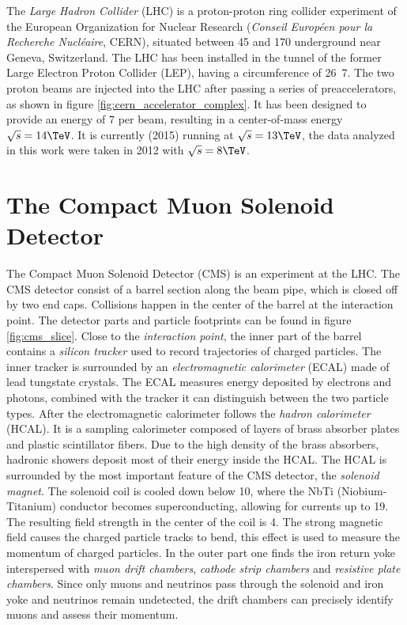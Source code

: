 The \emph{Large Hadron Collider} (LHC) is a proton-proton ring collider experiment of the European Organization for Nuclear Research (\emph{Conseil Européen pour la Recherche Nucléaire}, CERN), situated between \unit{45}{\meter} and \unit{170}{\meter} underground near Geneva, Switzerland. The LHC has been installed in the tunnel of the former Large Electron Proton Collider (LEP), having a circumference of \unit{26.7}{\kilo\meter}\cite{BV2009CERN,EB2008LHC}. The two proton beams are injected into the LHC after passing a series of preaccelerators, as shown in figure \ref{fig:cern_accelerator_complex}. It has been designed to provide an energy of \unit{7}{\TeV} per beam, resulting in a center-of-mass energy $\sqrt{s} = \unit{14}{\TeV}$. It is currently (2015) running at $\sqrt{s} = \unit{13}{\TeV}$, the data analyzed in this work were taken in 2012 with $\sqrt{s} = \unit{8}{\TeV}$.

\section{The Compact Muon Solenoid Detector}
The Compact Muon Solenoid Detector (CMS) is an experiment at the LHC. The CMS detector\cite{Co2008CMS} consist of a barrel section along the beam pipe, which is closed off by two end caps. Collisions happen in the center of the barrel at the interaction point. 
The detector parts and particle footprints can be found in figure \ref{fig:cms_slice}.
Close to the \emph{interaction point}, the inner part of the barrel contains a \emph{silicon tracker} used to record trajectories of charged particles. 
The inner tracker is surrounded by an \emph{electromagnetic calorimeter} (ECAL) made of lead tungstate crystals. The ECAL measures energy deposited by electrons and photons, combined with the tracker it can distinguish between the two particle types. 
After the electromagnetic calorimeter follows the \emph{hadron calorimeter} (HCAL). It is a sampling calorimeter composed of layers of brass absorber plates and plastic scintillator fibers. Due to the high density of the brass absorbers, hadronic showers deposit most of their energy inside the HCAL.
The HCAL is surrounded by the most important feature of the CMS detector, the \emph{solenoid magnet}. The solenoid coil is cooled down below \unit{10}{\kelvin}, where the NbTi (Niobium-Titanium) conductor becomes superconducting, allowing for currents up to \unit{19}{\kilo\ampere}. The resulting field strength in the center of the coil is \unit{4}{\tesla}. The strong magnetic field causes the charged particle tracks to bend, this effect is used to measure the momentum of charged particles.
In the outer part one finds the iron return yoke interspersed with \emph{muon drift chambers}, \emph{cathode strip chambers} and \emph{resistive plate chambers}. Since only muons and neutrinos pass through the solenoid and iron yoke and neutrinos remain undetected, the drift chambers can precisely identify muons and assess their momentum.

